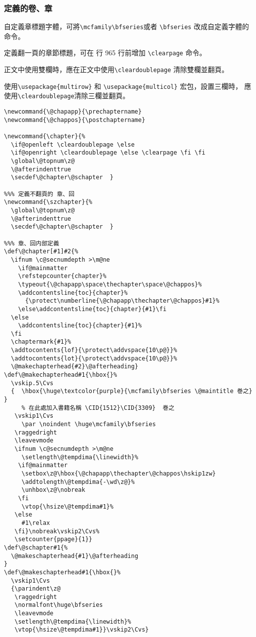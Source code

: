 \subsubsection{定義的卷、章}

\par 自定義章標題字體，可將\verb+\mcfamily\bfseries+或者 \verb+\bfseries+
改成自定義字體的命令。
\par 定義翻一頁的章節標題，可在 行 965 行前增加 \verb+\clearpage+ 命令。
\par 正文中使用雙欄時，應在正文中使用\verb+\cleardoublepage+ 清除雙欄並翻頁。
\par 使用\verb+\usepackage{multirow}+ 和 \verb+\usepackage{multicol}+ 宏包，設置三欄時，
應使用\verb+\cleardoublepage+清除三欄並翻頁。
\begin{lstlisting}[firstnumber=953]
\newcommand{\@chapapp}{\prechaptername}
\newcommand{\@chappos}{\postchaptername}

\newcommand{\chapter}{%
  \if@openleft \cleardoublepage \else
  \if@openright \cleardoublepage \else \clearpage \fi \fi
  \global\@topnum\z@
  \@afterindenttrue
  \secdef\@chapter\@schapter  }

%%% 定義不翻頁的 章、回
\newcommand{\szchapter}{%
  \global\@topnum\z@
  \@afterindenttrue
  \secdef\@chapter\@schapter  }

%%% 章、回内部定義
\def\@chapter[#1]#2{%
  \ifnum \c@secnumdepth >\m@ne
    \if@mainmatter
    \refstepcounter{chapter}%
    \typeout{\@chapapp\space\thechapter\space\@chappos}%
    \addcontentsline{toc}{chapter}%
      {\protect\numberline{\@chapapp\thechapter\@chappos}#1}%
    \else\addcontentsline{toc}{chapter}{#1}\fi
  \else
    \addcontentsline{toc}{chapter}{#1}%
  \fi
  \chaptermark{#1}%
  \addtocontents{lof}{\protect\addvspace{10\p@}}%
  \addtocontents{lot}{\protect\addvspace{10\p@}}%
  \@makechapterhead{#2}\@afterheading}
\def\@makechapterhead#1{\hbox{}%
  \vskip.5\Cvs
  {  \hbox{\huge\textcolor{purple}{\mcfamily\bfseries \@maintitle 巻之} }
  	 % 在此處加入書籍名稱 \CID{1512}\CID{3309}  巻之
   \vskip1\Cvs
     \par \noindent \huge\mcfamily\bfseries
   \raggedright
   \leavevmode
   \ifnum \c@secnumdepth >\m@ne
     \setlength\@tempdima{\linewidth}%
    \if@mainmatter
     \setbox\z@\hbox{\@chapapp\thechapter\@chappos\hskip1zw}
     \addtolength\@tempdima{-\wd\z@}%
     \unhbox\z@\nobreak
    \fi
     \vtop{\hsize\@tempdima#1}%
   \else
     #1\relax
   \fi}\nobreak\vskip2\Cvs%
   \setcounter{ppage}{1}}
\def\@schapter#1{%
  \@makeschapterhead{#1}\@afterheading
}
\def\@makeschapterhead#1{\hbox{}%
  \vskip1\Cvs
  {\parindent\z@
   \raggedright
   \normalfont\huge\bfseries
   \leavevmode
   \setlength\@tempdima{\linewidth}%
   \vtop{\hsize\@tempdima#1}}\vskip2\Cvs}
\end{lstlisting}


